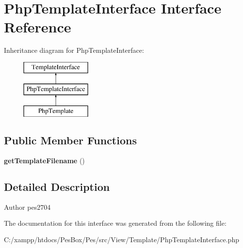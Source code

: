 \hypertarget{interface_pes_1_1_view_1_1_template_1_1_php_template_interface}{}\section{Php\+Template\+Interface Interface Reference}
\label{interface_pes_1_1_view_1_1_template_1_1_php_template_interface}
Inheritance diagram for Php\+Template\+Interface\+:\begin{figure}[H]
\begin{center}
\leavevmode
\includegraphics[height=3.000000cm]{interface_pes_1_1_view_1_1_template_1_1_php_template_interface}
\end{center}
\end{figure}
\subsection*{Public Member Functions}
\begin{DoxyCompactItemize}
\item 
\mbox{\label{interface_pes_1_1_view_1_1_template_1_1_php_template_interface_a487e0913fe1ce30f7cc6e1091abf6fdd}} 
{\bfseries get\+Template\+Filename} ()
\end{DoxyCompactItemize}


\subsection{Detailed Description}
\begin{DoxyAuthor}{Author}
pes2704 
\end{DoxyAuthor}


The documentation for this interface was generated from the following file\+:\begin{DoxyCompactItemize}
\item 
C\+:/xampp/htdocs/\+Pes\+Box/\+Pes/src/\+View/\+Template/Php\+Template\+Interface.\+php\end{DoxyCompactItemize}

